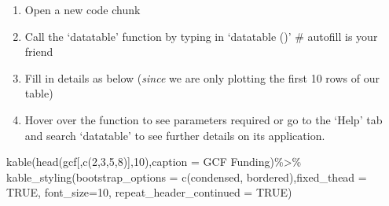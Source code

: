 \documentclass[
]{book}
\newenvironment{Shaded}{\begin{snugshade}}{\end{snugshade}}
\newcommand{\AttributeTok}[1]{\textcolor[rgb]{0.77,0.63,0.00}{#1}}
\newcommand{\ConstantTok}[1]{\textcolor[rgb]{0.00,0.00,0.00}{#1}}
\newcommand{\DecValTok}[1]{\textcolor[rgb]{0.00,0.00,0.81}{#1}}
\newcommand{\FunctionTok}[1]{\textcolor[rgb]{0.00,0.00,0.00}{#1}}
\newcommand{\NormalTok}[1]{#1}
\newcommand{\SpecialCharTok}[1]{\textcolor[rgb]{0.00,0.00,0.00}{#1}}
\newcommand{\StringTok}[1]{\textcolor[rgb]{0.31,0.60,0.02}{#1}}
\providecommand{\tightlist}{%
  \setlength{\itemsep}{0pt}\setlength{\parskip}{0pt}}
\begin{document}
\begin{enumerate}
\def\labelenumi{\arabic{enumi}.}
\tightlist
\item
  Open a new code chunk
\item
  Call the `datatable' function by typing in `datatable ()' \# autofill is your friend
\item
  Fill in details as below (\emph{since} we are only plotting the first 10 rows of our table)
\item
  Hover over the function to see parameters required or go to the `Help' tab and search `datatable' to see further details on its application.
\end{enumerate}

\begin{Shaded}
\begin{Highlighting}[]
\FunctionTok{kable}\NormalTok{(}\FunctionTok{head}\NormalTok{(gcf[,}\FunctionTok{c}\NormalTok{(}\DecValTok{2}\NormalTok{,}\DecValTok{3}\NormalTok{,}\DecValTok{5}\NormalTok{,}\DecValTok{8}\NormalTok{)],}\DecValTok{10}\NormalTok{),}\AttributeTok{caption =} \StringTok{\textquotesingle{}GCF Funding\textquotesingle{}}\NormalTok{)}\SpecialCharTok{\%\textgreater{}\%}
\FunctionTok{kable\_styling}\NormalTok{(}\AttributeTok{bootstrap\_options =} \FunctionTok{c}\NormalTok{(}\StringTok{\textquotesingle{}condensed\textquotesingle{}}\NormalTok{, }\StringTok{\textquotesingle{}bordered\textquotesingle{}}\NormalTok{),}\AttributeTok{fixed\_thead =} \ConstantTok{TRUE}\NormalTok{, }\AttributeTok{font\_size=}\DecValTok{10}\NormalTok{, }\AttributeTok{repeat\_header\_continued =} \ConstantTok{TRUE}\NormalTok{)}
\end{Highlighting}
\end{Shaded}
\end{document}
